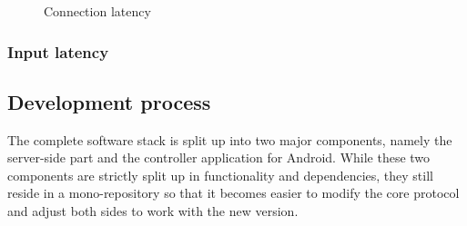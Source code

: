\begin{figure}[h]
    \centering
    \caption{Connection latency}
\end{figure}

\subsubsection{Input latency}

\subsection{Development process}

The complete software stack is split up into two major components, namely the server-side part and the controller application for Android.
While these two components are strictly split up in functionality and dependencies, they still reside in a mono-repository so that it becomes easier to modify the core protocol and adjust both sides to work with the new version.

